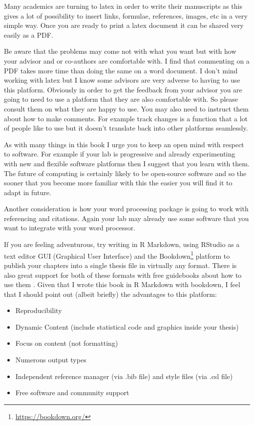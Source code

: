 \documentclass[
]{krantz}
\providecommand{\tightlist}{%
  \setlength{\itemsep}{0pt}\setlength{\parskip}{0pt}}
\renewcommand{\href}[2]{#2\footnote{\url{#1}}}
\begin{document}
Many academics are turning to latex in order to write their manuscripts as this gives a lot of possibility to insert links, formulae, references, images, etc in a very simple way. Once you are ready to print a latex document it can be shared very easily as a PDF.

Be aware that the problems may come not with what you want but with how your advisor and or co-authors are comfortable with. I find that commenting on a PDF takes more time than doing the same on a word document. I don't mind working with latex but I know some advisors are very adverse to having to use this platform. Obviously in order to get the feedback from your advisor you are going to need to use a platform that they are also comfortable with. So please consult them on what they are happy to use. You may also need to instruct them about how to make comments. For example track changes is a function that a lot of people like to use but it doesn't translate back into other platforms seamlessly.

As with many things in this book I urge you to keep an open mind with respect to software. For example if your lab is progressive and already experimenting with new and flexible software platforms then I suggest that you learn with them. The future of computing is certainly likely to be open-source software and so the sooner that you become more familiar with this the easier you will find it to adapt in future.

Another consideration is how your word processing package is going to work with referencing and citations. Again your lab may already use some software that you want to integrate with your word processor.

If you are feeling adventurous, try writing in R Markdown, using RStudio as a text editor GUI (Graphical User Interface) and the \href{https://bookdown.org/}{Bookdown} platform to publish your chapters into a single thesis file in virtually any format. There is also great support for both of these formats with free guidebooks about how to use them \citep{xie2016bookdown, xie2018r}. Given that I wrote this book in R Markdown with bookdown, I feel that I should point out (albeit briefly) the advantages to this platform:

\begin{itemize}
\tightlist
\item
  Reproducibility
\item
  Dynamic Content (include statistical code and graphics inside your thesis)
\item
  Focus on content (not formatting)
\item
  Numerous output types
\item
  Independent reference manager (via .bib file) and style files (via .csl file)
\item
  Free software and community support
\end{itemize}
\end{document}
